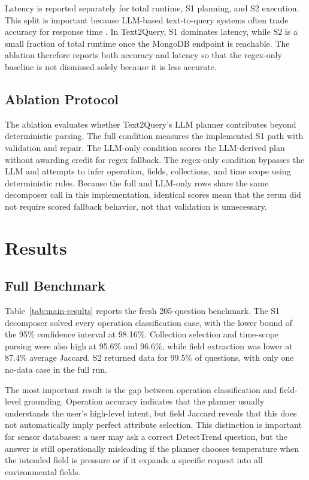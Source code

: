\documentclass[11pt]{article}
\begin{document}
Latency is reported separately for total runtime, S1 planning, and S2 execution. This split is important because LLM-based text-to-query systems often trade accuracy for response time \cite{rajkumar2022evaluating,shi2024survey}. In Text2Query, S1 dominates latency, while S2 is a small fraction of total runtime once the MongoDB endpoint is reachable. The ablation therefore reports both accuracy and latency so that the regex-only baseline is not dismissed solely because it is less accurate.

\subsection{Ablation Protocol}

The ablation evaluates whether Text2Query's LLM planner contributes beyond deterministic parsing. The full condition measures the implemented S1 path with validation and repair. The LLM-only condition scores the LLM-derived plan without awarding credit for regex fallback. The regex-only condition bypasses the LLM and attempts to infer operation, fields, collections, and time scope using deterministic rules. Because the full and LLM-only rows share the same decomposer call in this implementation, identical scores mean that the rerun did not require scored fallback behavior, not that validation is unnecessary.

\section{Results}

\subsection{Full Benchmark}

Table~\ref{tab:main-results} reports the fresh 205-question benchmark. The S1 decomposer solved every operation classification case, with the lower bound of the 95\% confidence interval at 98.16\%. Collection selection and time-scope parsing were also high at 95.6\% and 96.6\%, while field extraction was lower at 87.4\% average Jaccard. S2 returned data for 99.5\% of questions, with only one no-data case in the full run.

The most important result is the gap between operation classification and field-level grounding. Operation accuracy indicates that the planner usually understands the user's high-level intent, but field Jaccard reveals that this does not automatically imply perfect attribute selection. This distinction is important for sensor databases: a user may ask a correct DetectTrend question, but the answer is still operationally misleading if the planner chooses temperature when the intended field is pressure or if it expands a specific request into all environmental fields.
\end{document}
